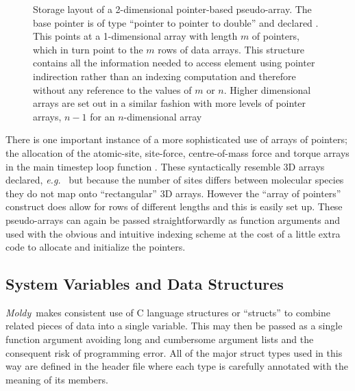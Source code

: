 \documentclass[a4paper,twoside]{report}
\newcommand{\moldy}{\emph{Moldy}}
\newcommand{\eg}{\emph{e.g.}}
\begin{document}
\begin{figure}[tb]
  \begin{center}
    
  \end{center}
  \caption[Storage layout of a 2-dimensional pointer-based
    pseudo-array]{Storage layout of a 2-dimensional pointer-based
    pseudo-array. The base pointer  is of type ``pointer to
    pointer to double'' and declared .  This points
    at a 1-dimensional array with length $m$ of pointers, which in
    turn point to the $m$ rows of data arrays.  This structure
    contains all the information needed to access element
     using pointer indirection rather than an indexing
    computation and therefore without any reference to the values of
    $m$ or $n$.  Higher dimensional arrays are set out in a similar
    fashion with more levels of pointer arrays, $n-1$ for an
    $n$-dimensional array}
    \label{fig:arralloc}
\end{figure}

There is one important instance of a more sophisticated use of arrays
of pointers; the allocation of the atomic-site, site-force,
centre-of-mass force and torque arrays in the main timestep loop
function . These syntactically resemble 3D arrays
declared, \eg\  but because the
number of sites differs between molecular species they do not map onto
``rectangular'' 3D arrays.  However the ``array of pointers''
construct does allow for rows of different lengths and this is easily
set up.  These pseudo-arrays can again be passed straightforwardly as
function arguments and used with the obvious and intuitive indexing
scheme at the cost of a little extra code to allocate and initialize
the pointers.

\subsection{System Variables and Data Structures}
\label{sec:sysvars}

\moldy\ makes consistent use of C language structures or ``structs''
to combine related pieces of data into a single variable. This may
then be passed as a single function argument avoiding long and
cumbersome argument lists and the consequent risk of programming
error.  All of the major struct types used in this way are defined in
the header file  where each type is carefully annotated
with the meaning of its members.
\end{document}

